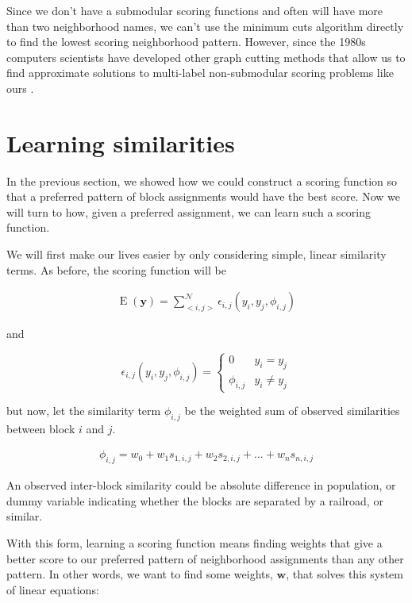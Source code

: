 Since we don't have a submodular scoring functions and often will have
more than two neighborhood names, we can't use the minimum cuts
algorithm directly to find the lowest scoring neighborhood
pattern. However, since the 1980s computers scientists have developed
other graph cutting methods that allow us to find approximate
solutions to multi-label non-submodular scoring problems like ours
\cite{something}.

\section*{Learning similarities}
In the previous section, we showed how we could construct a scoring
function so that a preferred pattern of block assignments would have
the best score. Now we will turn to how, given a preferred assignment,
we can learn such a scoring function. 

We will first make our lives easier by only considering simple, linear
similarity terms. As before, the scoring function will be

\begin{align}
\operatorname{E}(\mathbf{y}) = \sum_{<i,j>}^{\mathcal{N}}\epsilon_{i,j}(y_i,y_j,\phi_{i,j})
\end{align}

\noindent
and

\begin{equation}
\epsilon_{i,j}(y_i,y_j,\phi_{i,j}) = \begin{cases}
  0 &y_i = y_j \\
  \phi_{i,j} &y_i \neq y_j
\end{cases}
\end{equation}

\noindent
but now, let the similarity term $\phi_{i,j}$ be the weighted sum of
observed similarities between block $i$ and $j$. 

\begin{align}
\phi_{i,j} = w_0 + w_1s_{1,i,j} + w_2s_{2,i,j} + ... + w_ns_{n,i,j}
\end{align} 

\noindent
An observed inter-block similarity could be absolute difference in
population, or dummy variable indicating whether the blocks are
separated by a railroad, or similar.

\noindent

With this form, learning a scoring function means finding weights
that give a better score to our preferred pattern of neighborhood
assignments than any other pattern. In other words, we want to find
some weights, $\mathbf{w}$, that solves this system of linear
equations:

